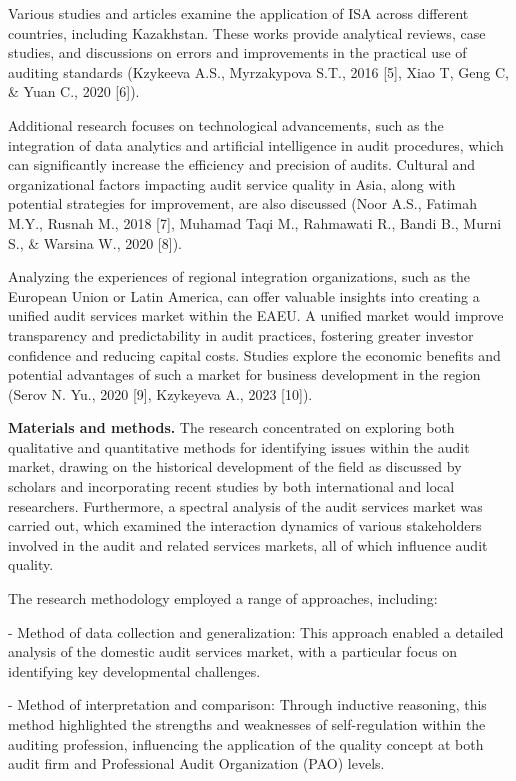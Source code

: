 Various studies and articles examine the application of ISA across
different countries, including Kazakhstan. These works provide
analytical reviews, case studies, and discussions on errors and
improvements in the practical use of auditing standards (Kzykeeva A.S.,
Myrzakypova S.T., 2016 {[}5{]}, Xiao T, Geng C, \& Yuan C., 2020
{[}6{]}).

Additional research focuses on technological advancements, such as the
integration of data analytics and artificial intelligence in audit
procedures, which can significantly increase the efficiency and
precision of audits. Cultural and organizational factors impacting audit
service quality in Asia, along with potential strategies for
improvement, are also discussed (Noor A.S., Fatimah M.Y., Rusnah M.,
2018 {[}7{]}, Muhamad Taqi M., Rahmawati R., Bandi B., Murni S., \&
Warsina W., 2020 {[}8{]}).

Analyzing the experiences of regional integration organizations, such as
the European Union or Latin America, can offer valuable insights into
creating a unified audit services market within the EAEU. A unified
market would improve transparency and predictability in audit practices,
fostering greater investor confidence and reducing capital costs.
Studies explore the economic benefits and potential advantages of such a
market for business development in the region (Serov N. Yu., 2020
{[}9{]}, Kzykeyeva A., 2023 {[}10{]}).

\textbf{Materials and methods.} The research concentrated on exploring
both qualitative and quantitative methods for identifying issues within
the audit market, drawing on the historical development of the field as
discussed by scholars and incorporating recent studies by both
international and local researchers. Furthermore, a spectral analysis of
the audit services market was carried out, which examined the
interaction dynamics of various stakeholders involved in the audit and
related services markets, all of which influence audit quality.

The research methodology employed a range of approaches, including:

- Method of data collection and generalization: This approach enabled a
detailed analysis of the domestic audit services market, with a
particular focus on identifying key developmental challenges.

- Method of interpretation and comparison: Through inductive reasoning,
this method highlighted the strengths and weaknesses of self-regulation
within the auditing profession, influencing the application of the
quality concept at both audit firm and Professional Audit Organization
(PAO) levels.

